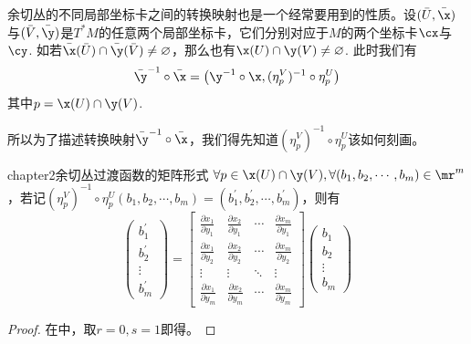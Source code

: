 余切丛的不同局部坐标卡之间的转换映射也是一个经常要用到的性质。设$(\bar{  U  },\bar{  \x })$与$(\bar{  V  },\bar{  \y })$是$T^{\ast}M$的任意两个局部坐标卡，它们分别对应于$M$的两个坐标卡$\cx$与$\cy$. 如若$\bar{  \x }(\bar{  U })\cap \bar{  \y }(\bar{  V })\neq\varnothing$，那么也有$\x(U)\cap \y(V)\neq\varnothing$. 此时我们有
\[
	\bar{  \y }^{-1}\circ\bar{  \x }=\left( \y^{-1}\circ\x,(\eta^{V}_{p} )^{-1}\circ \eta^{U}_{p}\right)
\]
其中$p=\x(U)\cap \y(V)$. 

所以为了描述转换映射$\bar{  \y }^{-1}\circ\bar{  \x }$，我们得先知道$(\eta^{V}_{p} )^{-1}\circ \eta^{U}_{p}$该如何刻画。

\begin{mylem}{}{chapter2余切丛过渡函数的矩阵形式}
	$\forall p\in\x(U)\cap\y(V),\forall(b_{1},b_{2},\cdots,b_{m})\in \mr^{m}$，若记$(\eta^{V}_{p})^{-1}\circ\eta^{U}_{p}(b_{1},b_{2},\cdots,b_{m})=(b^{\prime}_{1},b^{\prime}_{2},\cdots,b^{\prime}_{m})$，则有
	\begin{equation}
	\left( \begin{array}{cccc}{b^{\prime}_{1}} \\ {b^{\prime}_{2}}  \\ {\vdots} \\ {b^{\prime}_{m}}\end{array}\right)=\left[\begin{array}{ccccc}
		\frac { \partial x _ { 1 } } { \partial y _ { 1 } }& \frac { \partial x _ { 2 } } { \partial y _ { 1 } }& \cdots &\frac { \partial x _ { m } } { \partial y _ { 1 } }\\
		\frac { \partial x _ { 1 } } { \partial y _ {2 } }& \frac { \partial x _ { 2 } } { \partial y _ { 2 } }& \cdots &\frac { \partial x _ { m } } { \partial y _ { 2 } }\\
		\vdots & \vdots &\ddots & \vdots\\
		\frac { \partial x _ { 1 } } { \partial y _ { m } }& \frac { \partial x _ { 2 } } { \partial y _ { m } }& \cdots &\frac { \partial x _ { m} } { \partial y _ { m } }
		\end{array}\right] \left( \begin{array}{cccc}{b_{1}} \\ {b_{2}}  \\ {\vdots} \\ {b_{m}}\end{array}\right)
			\label{转化式2}
	\end{equation}
\end{mylem}
\begin{proof}
在中，取$r=0,s=1$即得。
\end{proof}

